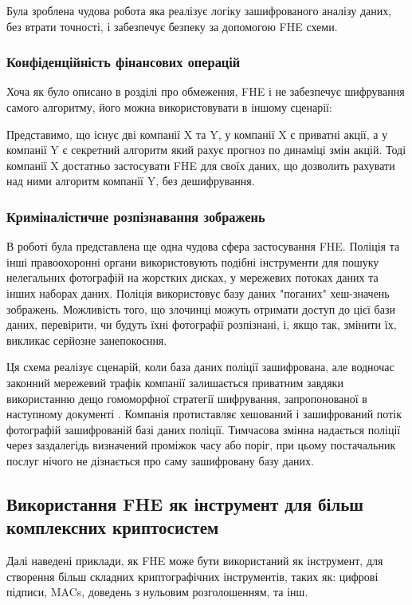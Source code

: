 Була зроблена чудова робота \cite{zhiqiang2005} яка реалізує логіку зашифрованого аналізу
даних, без втрати точності, і забезпечує безпеку за допомогою FHE схеми.

\subsubsection*{Конфіденційність фінансових операцій}
Хоча як було описано в розділі про обмеження, FHE і не забезпечує шифрування самого алгоритму,
його можна використовувати в іншому сценарії:

Представимо, що існує дві компанії X та Y, у компанії X є приватні акції, а у компанії Y є
секретний алгоритм який рахує прогноз по динаміці змін акцій. Тоді компанії X достатньо 
застосувати FHE для своїх даних, що дозволить рахувати над ними алгоритм компанії Y, без
дешифрування.

\subsubsection*{Криміналістичне розпізнавання зображень}
В роботі \cite{bosch2014} була представлена ще одна чудова сфера застосування FHE. 
Поліція та інші правоохоронні органи використовують подібні інструменти для пошуку нелегальних
фотографій на жорстких дисках, у мережевих потоках даних та інших наборах даних. Поліція
використовує базу даних "поганих" хеш-значень зображень. Можливість того, що злочинці можуть
отримати доступ до цієї бази даних, перевірити, чи будуть їхні фотографії розпізнані, і, якщо
так, змінити їх, викликає серйозне занепокоєння.

Ця схема реалізує сценарій, коли база даних поліції зашифрована, але водночас законний
мережевий трафік компанії залишається приватним завдяки використанню дещо гомоморфної
стратегії шифрування, запропонованої в наступному документі 
\cite{10.1007/978-3-642-22792-9_29}. Компанія протиставляє хешований і зашифрований потік
фотографій зашифрованій базі даних поліції. Тимчасова змінна надається поліції через
заздалегідь визначений проміжок часу або поріг, при цьому постачальник послуг нічого не
дізнається про саму зашифровану базу даних.

\subsection*{Використання FHE як інструмент для більш комплексних криптосистем}

Далі наведені приклади, як FHE може бути використаний як інструмент, для створення більш
складних криптографічних інструментів, таких як: цифрові  підписи, MACs, доведень з нульовим
розголошенням, та інш.

